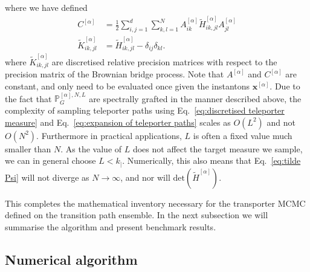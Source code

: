 where we have defined
\begin{subequations}
\begin{align}
	C^{[\alpha]} & = \frac{1}{2} \sum_{i,j=1}^d \sum_{k,l=1}^N A^{[\alpha]}_{ik} \tilde{H}^{[\alpha]}_{ik,jl} A^{[\alpha]}_{jl} \\
	\tilde{K}^{[\alpha]}_{ik,jl} & = \tilde{H}^{[\alpha]}_{ik,jl} - \delta_{ij} \delta_{kl} \label{eq:discretise relative precision matrix}.
\end{align}
\end{subequations}
where $\tilde{K}^{[\alpha]}_{ik,jl}$ are discretised relative precision matrices with respect to the precision matrix of the Brownian bridge process. Note that $A^{[\alpha]}$ and $C^{[\alpha]}$ are constant, and only need to be evaluated once given the instantons $\mathbf{x}^{[\alpha]}$. Due to the fact that $\mathbb{P}_G^{[\alpha],N,L}$ are spectrally grafted in the manner described above, the complexity of sampling teleporter paths using Eq.~\ref{eq:discretised teleporter measure} and Eq.~\ref{eq:expansion of teleporter paths} scales as $O(L^2)$ and not $O(N^2)$. Furthermore in practical applications, $L$ is often a fixed value much smaller than $N$. As the value of $L$ does not affect the target measure we sample, we can in general choose $L < k_|$. Numerically, this also means that Eq.~\ref{eq:tilde Psi} will not diverge as $N \to \infty$, and nor will $\text{det} (\tilde{H}^{[\alpha]})$.

This completes the mathematical inventory necessary for the transporter MCMC defined on the transition path ensemble. In the next subsection we will summarise the algorithm and present benchmark results.

\subsection{Numerical algorithm} \label{sec:TMC Numerical algorithm}

